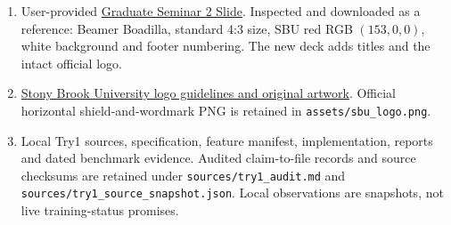 \documentclass[11pt]{article}
\begin{document}
\begin{enumerate}
\item User-provided \href{https://www.overleaf.com/project/67fd57b643c2b55bc9d6d26b}{Graduate Seminar 2 Slide}. Inspected and downloaded as a reference: Beamer Boadilla, standard 4:3 size, SBU red RGB $(153,0,0)$, white background and footer numbering. The new deck adds titles and the intact official logo.
\item \href{https://www.stonybrook.edu/marcom/design-visual-identity/logos.html}{Stony Brook University logo guidelines and original artwork}. Official horizontal shield-and-wordmark PNG is retained in \texttt{assets/sbu\_logo.png}.
\item Local Try1 sources, specification, feature manifest, implementation, reports and dated benchmark evidence. Audited claim-to-file records and source checksums are retained under \texttt{sources/try1\_audit.md} and \texttt{sources/try1\_source\_snapshot.json}. Local observations are snapshots, not live training-status promises.
\end{enumerate}
\end{document}
